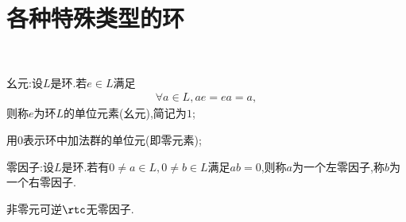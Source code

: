 \section{各种特殊类型的环}
\begin{proposition}\label{auhisgnjdvk}\ 
    \begin{center}
    \end{center}
\end{proposition}
\begin{remark}
    幺元:设$L$是环.若$e\in L$满足\begin{align*}
        \forall a\in L,ae=ea=a,
    \end{align*}则称$e$为环$L$的单位元素(幺元),简记为$1$;

    用$0$表示环中加法群的单位元(即零元素);

    零因子:设$L$是环.若有$0\neq a\in L,0\neq b\in L$满足$ab=0$,则称$a$为一个左零因子,称$b$为一个右零因子.
\end{remark}
\begin{lemma}\label{zncxkjvna}
    非零元可逆$\rtc$无零因子.
\end{lemma}
